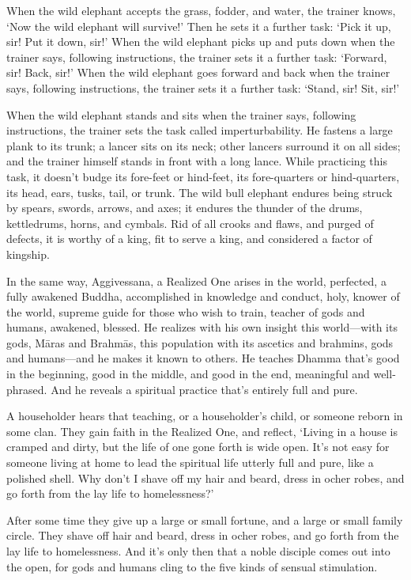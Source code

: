 \documentclass[12pt,openany]{book}%
\begin{document}
When the wild elephant accepts the grass, fodder, and water, the trainer knows, ‘Now the wild elephant will survive!’ Then he sets it a further task: ‘Pick it up, sir! Put it down, sir!’ When the wild elephant picks up and puts down when the trainer says, following instructions, the trainer sets it a further task: ‘Forward, sir! Back, sir!’ When the wild elephant goes forward and back when the trainer says, following instructions, the trainer sets it a further task: ‘Stand, sir! Sit, sir!’ 

When the wild elephant stands and sits when the trainer says, following instructions, the trainer sets the task called imperturbability. He fastens a large plank to its trunk; a lancer sits on its neck; other lancers surround it on all sides; and the trainer himself stands in front with a long lance. While practicing this task, it doesn’t budge its fore-feet or hind-feet, its fore-quarters or hind-quarters, its head, ears, tusks, tail, or trunk. The wild bull elephant endures being struck by spears, swords, arrows, and axes; it endures the thunder of the drums, kettledrums, horns, and cymbals. Rid of all crooks and flaws, and purged of defects, it is worthy of a king, fit to serve a king, and considered a factor of kingship. 

In the same way, Aggivessana, a Realized One arises in the world, perfected, a fully awakened Buddha, accomplished in knowledge and conduct, holy, knower of the world, supreme guide for those who wish to train, teacher of gods and humans, awakened, blessed. He realizes with his own insight this world—with its gods, \textsanskrit{Māras} and \textsanskrit{Brahmās}, this population with its ascetics and brahmins, gods and humans—and he makes it known to others. He teaches Dhamma that’s good in the beginning, good in the middle, and good in the end, meaningful and well-phrased. And he reveals a spiritual practice that’s entirely full and pure. 

A householder hears that teaching, or a householder’s child, or someone reborn in some clan. They gain faith in the Realized One, and reflect, ‘Living in a house is cramped and dirty, but the life of one gone forth is wide open. It’s not easy for someone living at home to lead the spiritual life utterly full and pure, like a polished shell. Why don’t I shave off my hair and beard, dress in ocher robes, and go forth from the lay life to homelessness?’ 

After some time they give up a large or small fortune, and a large or small family circle. They shave off hair and beard, dress in ocher robes, and go forth from the lay life to homelessness. And it’s only then that a noble disciple comes out into the open, for gods and humans cling to the five kinds of sensual stimulation. 
\end{document}
